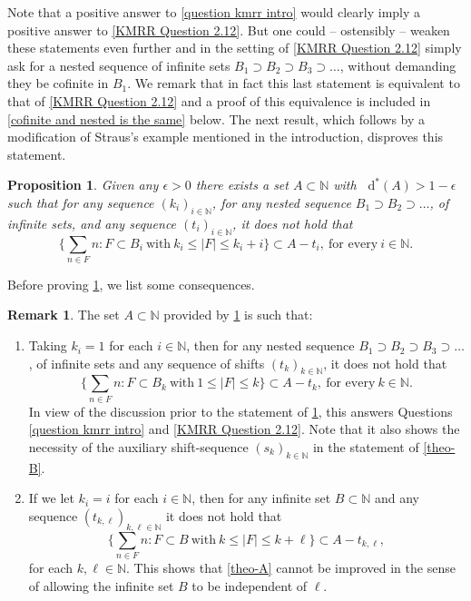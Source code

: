 \documentclass[letter, 11pt]{article}
\newtheorem{prop}[theo]{Proposition}
\theoremstyle{definition}
\newtheorem{remark}[theo]{Remark}
\theoremstyle{plain}
\newcommand{\N}{\mathbb{N}}
\newcommand*\diff{\mathop{}\!\mathrm{d}}
\newcommand{\1}{\mathbbm{1}}
\begin{document}
Note that a positive answer to \cref{question kmrr intro} would clearly 
imply a positive answer to \cref{KMRR Question 2.12}. But one could -- ostensibly -- weaken these statements even further and in the setting of \cref{KMRR Question 2.12} simply ask for a nested sequence of infinite sets $B_1 \supset B_2 \supset B_3 \supset \dots$, without demanding they be cofinite in $B_1$. We remark that in fact this last statement is equivalent to that of \cref{KMRR Question 2.12} and a proof of this equivalence is included in \cref{cofinite and nested is the same} below. The next result, which follows by a modification of Straus's example mentioned in the introduction, disproves this statement. 
\begin{prop}\label{1.2 is optimal (ii)}
Given any $\epsilon>0$ there exists a set $A\subset \N$ with $\diff^*(A)>1-\epsilon$ such that for any sequence $(k_i)_{i \in \N}$, for any nested sequence $B_1\supset B_2 \supset \ldots$, of infinite sets, and any sequence $(t_i)_{i\in \N}$, it does not hold that
$$\bigg\{\sum_{n\in F}n: F\subset B_i\ \text{with}\ k_i\leq |F|\leq k_i+i \bigg\}\subset A-t_i,\ \text{for every}\ i\in \N.$$
\end{prop}

Before proving \cref{1.2 is optimal (ii)}, we list some 
consequences. 
\begin{remark}\label{counterexample 1}
    The set $A\subset \N$ provided by \cref{1.2 is optimal (ii)} is such that:
    \begin{enumerate}
        \item Taking $k_i=1$ for each $i\in \N$, then for any nested sequence $B_1 \supset B_2 \supset B_3 \supset \dots$, of infinite sets and any sequence of shifts $(t_k)_{k\in \N}$, it does not hold that 
$$\bigg\{\sum_{n\in F}n: F\subset B_k\ \text{with}\ 1\leq |F|\leq k \bigg\}
 \subset A-t_k,\ \text{for every}\ k\in \N.$$
In view of the discussion prior to the statement of \cref{1.2 is optimal (ii)}, this answers Questions \ref{question kmrr intro} and \ref{KMRR Question 2.12}. Note that it also shows the necessity of the auxiliary shift-sequence 
$(s_k)_{k\in \N}$ in the statement of \cref{theo-B}.
\item If we let $k_i=i$ for each $i\in \N$, then for any infinite set $B\subset \N$ and any sequence $(t_{k,\ell})_{k,\ell \in \N}$ it does not hold that
$$ \bigg\{\sum_{n\in F}n: F\subset B\ \text{with}\ k\leq |F|\leq k+\ell \bigg\} \subset A-t_{k,\ell},$$
for each $k,\ell \in \N$. This shows that \cref{theo-A} cannot be 
improved in the sense of allowing the infinite set $B$ to be independent of $\ell$. 
    \end{enumerate}
\end{remark}
\end{document}
